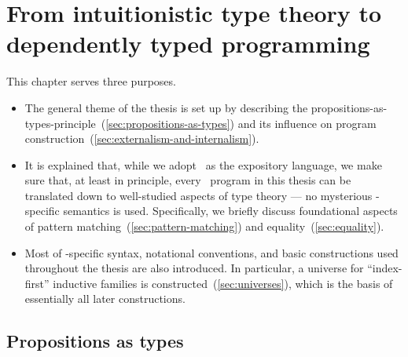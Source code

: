 \chapter{From intuitionistic type theory to dependently typed programming}
\label{chap:background}

This chapter serves three purposes.
\begin{itemize}
\item The general theme of the thesis is set up by describing the propositions-as-types-principle~(\autoref{sec:propositions-as-types}) and its influence on program construction~(\autoref{sec:externalism-and-internalism}).
\item It is explained that, while we adopt \Agda\ as the expository language, we make sure that, at least in principle, every \Agda\ program in this thesis can be translated down to well-studied aspects of type theory --- no mysterious \Agda-specific semantics is used.
Specifically, we briefly discuss foundational aspects of pattern matching~(\autoref{sec:pattern-matching}) and equality~(\autoref{sec:equality}).
\item Most of \Agda-specific syntax, notational conventions, and basic constructions used throughout the thesis are also introduced.
In particular, a universe for ``index-first'' inductive families is constructed~(\autoref{sec:universes}), which is the basis of essentially all later constructions.
\end{itemize}


\section{Propositions as types}
\label{sec:propositions-as-types}

